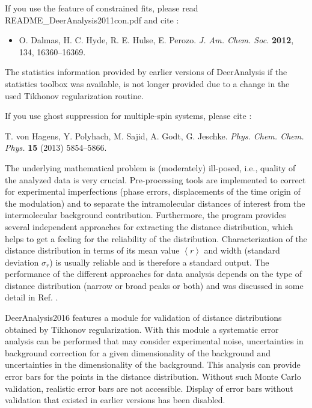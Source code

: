 \documentclass{article}
\begin{document}
If you use the feature of constrained fits, please read {\ttfamily README\_DeerAnalysis2011con.pdf} and cite \cite{dalmas2012}:
 
\begin{itemize}
  \item O. Dalmas, H. C. Hyde, R. E. Hulse, E. Perozo. \emph{J. Am. Chem. Soc.} {\bf 2012}, 134, 16360--16369.
\end{itemize}

The statistics information provided by earlier versions of DeerAnalysis if the statistics toolbox was available, is not longer provided due to a change in the used Tikhonov regularization routine.

If you use ghost suppression for multiple-spin systems, please cite \cite{vonHagens2013}:

T. von Hagens, Y. Polyhach, M. Sajid, A. Godt, G. Jeschke.
{\em Phys. Chem. Chem. Phys.} {\bf 15} (2013) 5854--5866.

The underlying mathematical problem is (moderately) ill-posed, i.e., quality of the analyzed data is very crucial. Pre-processing tools are implemented to correct for experimental imperfections (phase errors, displacements of the time origin of the modulation) and to separate the intramolecular distances of interest from the intermolecular background contribution. Furthermore, the program provides several independent approaches for extracting the distance distribution, which helps to get a feeling for the reliability of the distribution. Characterization of the distance distribution in terms of its mean value $\left\langle r \right\rangle$ and width (standard deviation $\sigma_{r}$) is usually reliable \cite{jeschke2004a} and is therefore a standard output. The performance of the different approaches for data analysis depends on the type of distance distribution (narrow or broad peaks or both) and was discussed in some detail in Ref. \cite{jeschke2004a}.

DeerAnalysis2016 features a module for validation of distance distributions obtained by Tikhonov regularization. With this module a systematic error analysis can be performed that may consider experimental noise, uncertainties in background correction for a given dimensionality of the background and uncertainties in the dimensionality of the background. This analysis can provide error bars for the points in the distance distribution. Without such Monte Carlo validation, realistic error bars are not accessible. Display of error bars without validation that existed in earlier versions has been disabled.
\end{document}
